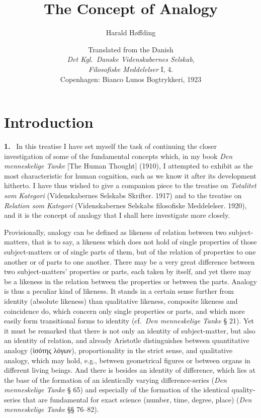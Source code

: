 \documentclass[12pt]{book}
\title{The Concept of Analogy}
\author{Harald Høffding}
\date{Translated from the Danish\\[0.6em]
  \small \textit{Det Kgl.\ Danske Videnskabernes Selskab},\\
  \textit{Filosofiske Meddelelser} I, 4.\\
  Copenhagen: Bianco Lunos Bogtrykkeri, 1923}
\newcommand{\hnum}[1]{\noindent\textbf{#1.}~}
\newcommand{\opage}[1]{\marginnote{\footnotesize\textit{[#1]}}}
\begin{document}
\maketitle
\tableofcontents



\chapter*{Introduction}
\label{ch:intro}

\hnum{\opage{3}1} In this treatise I have set myself the task of continuing the closer
investigation of some of the fundamental concepts which, in my book
\textit{Den menneskelige Tanke} [The Human Thought] (1910), I attempted to
exhibit as the most characteristic for human cognition, such as we know it
after its development hitherto. I have thus wished to give a companion piece to
the treatise on \textit{Totalitet som Kategori} (Videnskabernes Selskabs
Skrifter. 1917) and to the treatise on \textit{Relation som Kategori}
(Videnskabernes Selskabs filosofiske Meddelelser. 1920), and it is the concept
of analogy that I shall here investigate more closely.

Provisionally, analogy can be defined as likeness of relation between two
subject-matters, that is to say, a likeness which does not hold of single
properties of those subject-matters or of single parts of them, but of the
relation of properties to one another or of parts to one another. There may be
a very great difference between two subject-matters' properties or parts, each
taken by itself, and yet there may be a likeness in the relation between the
properties or between the parts. Analogy is thus a peculiar kind of likeness.
It stands in a certain sense further from identity (absolute likeness) than
qualitative likeness, composite likeness and coincidence do, which concern only
single properties or parts, and which more easily form transitional forms to
identity (cf.\ \textit{Den menneskelige Tanke} § 21). Yet it must be remarked
that there is not only an identity of subject-matter, but also an \opage{4}identity of
relation, and already Aristotle distinguishes between quantitative analogy
(ἰσότης λόγων), proportionality in the strict sense, and qualitative analogy,
which may hold, e.g., between geometrical figures or between organs in
different living beings. And there is besides an identity of difference, which
lies at the base of the formation of an identically varying difference-series
(\textit{Den menneskelige Tanke} § 65) and especially of the formation of the
identical quality-series that are fundamental for exact science (number, time,
degree, place) (\textit{Den menneskelige Tanke} §§ 76--82).
\end{document}
